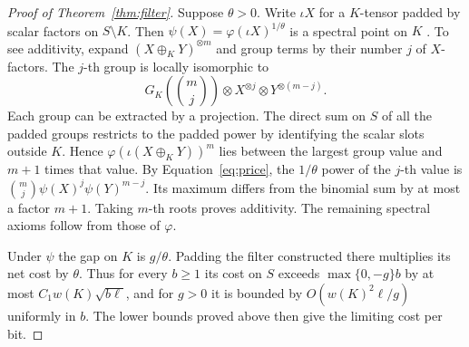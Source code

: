 \begin{proof}[Proof of Theorem~\ref{thm:filter}]
Suppose \(\theta>0\). Write \(\iota X\) for a \(K\)-tensor padded by
scalar factors on \(S\setminus K\). Then
\(\psi(X)=\varphi(\iota X)^{1/\theta}\) is a spectral point on \(K\)
\cite[Section~]{oaG}. To see additivity, expand
\((X\oplus_K Y)^{\otimes m}\) and group terms by their number \(j\) of
\(X\)-factors. The \(j\)-th group is locally isomorphic to
\[
 G_K\!\left(\binom mj\right)
       \otimes X^{\otimes j}\otimes Y^{\otimes(m-j)}.
\]
Each group can be extracted by a projection. The direct sum on \(S\)
of all the padded groups restricts to the padded power by identifying
the scalar slots outside \(K\). Hence \(\varphi(\iota(X\oplus_K Y))^m\)
lies between the largest group value and \(m+1\) times that value.
By Equation~\eqref{eq:price}, the \(1/\theta\) power of the \(j\)-th value
is \(\binom mj\psi(X)^j\psi(Y)^{m-j}\). Its maximum differs from
the binomial sum by at most a factor \(m+1\). Taking \(m\)-th roots
proves additivity. The remaining spectral axioms follow from those
of \(\varphi\).

Under \(\psi\) the gap on \(K\) is \(g/\theta\). Padding the filter
constructed there multiplies its net cost by \(\theta\). Thus for
every \(b\ge1\) its cost on \(S\) exceeds \(\max\{0,-g\}b\) by at
most \(C_1 w(K)\sqrt{b\ell}\), and for \(g>0\) it is bounded by
\(O(w(K)^2\ell/g)\) uniformly in \(b\). The lower bounds proved
above then give the limiting cost per bit.
\end{proof}
